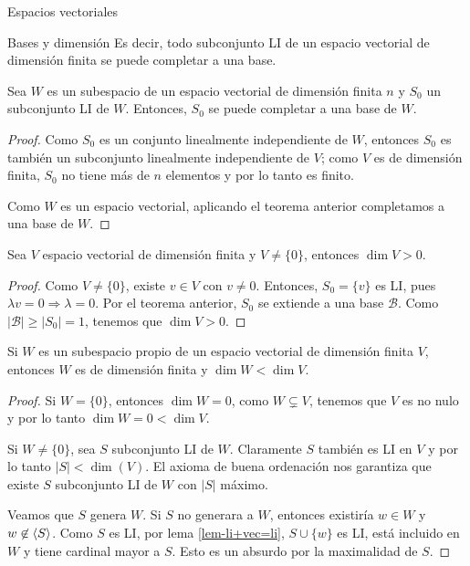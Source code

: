 \begin{chapter}{Espacios vectoriales}
\begin{section}{Bases y dimensi\'on}
Es decir, todo subconjunto LI de un espacio vectorial de dimensión finita se puede completar a una base.  

    \begin{corolario}
        Sea $W$ es un subespacio de un espacio vectorial de dimensión finita $n$ y $S_0$ un subconjunto LI de $W$. Entonces, $S_0$ se puede completar a una base de $W$. 
    \end{corolario}
    \begin{proof}
        Como $S_0$ es un conjunto linealmente independiente de $W$, entonces $S_0$ es también un subconjunto linealmente independiente de $V$; como $V$ es de dimensión finita, $S_0$ no tiene más de $n$ elementos y por lo tanto es finito.
        
        Como $W$ es un espacio vectorial, aplicando el teorema anterior completamos a una base de $W$. 
    \end{proof}

    \begin{corolario}
        Sea $V$ espacio vectorial de dimensión finita y $V \ne \{0\}$, entonces $\dim V >0$.
    \end{corolario}
    \begin{proof}
        Como $V \ne \{0\}$,  existe $v \in V$ con $v \ne 0$. Entonces, $S_0 = \{v\}$ es LI, pues $\lambda v =0 \Rightarrow \lambda =0$. Por el teorema anterior, $S_0$ se extiende a una base $\mathcal B$. Como $|\mathcal B| \ge |S_0| =1$, tenemos que $\dim V >0$.    
    \end{proof}
    
    \begin{corolario}\label{dimw-menor-dimv}
        Si $W$ es un subespacio propio de un espacio vectorial de dimensión finita $V$, entonces $W$ es de dimensión finita y  $\dim W < \dim V$.
    \end{corolario}
    \begin{proof} Si $W = \{0\}$, entonces $\dim W = 0$,  como $W \subsetneq V$,  tenemos que $V$  es no nulo y por lo tanto $\dim W = 0 < \dim V$. 
        

        Si  $W \ne \{0\}$,  sea $S$ subconjunto LI de $W$. Claramente $S$ también es LI en $V$ y por lo tanto $|S| < \dim(V)$. El axioma de buena ordenación nos garantiza que existe  $S$ subconjunto LI de $W$ con $|S|$ máximo. 
        
        Veamos que $S$ genera $W$. Si $S$ no generara a $W$,  entonces existiría $w \in W$ y $w\not\in \langle S\rangle$. Como $S$  es LI,  por lema \ref{lem-li+vec=li}, $S \cup \{w\}$ es LI,  está incluido en $W$ y tiene cardinal mayor a $S$. Esto es un absurdo por la maximalidad de $S$.
        

\end{proof}
\end{section}
\end{chapter}
